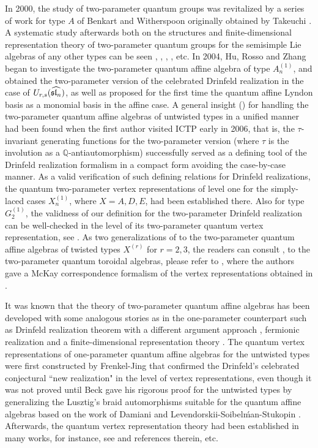 \documentclass{amsproc}
\theoremstyle{remark}
\numberwithin{equation}{section}
\begin{document}
In 2000, the study of two-parameter quantum groups was revitalized by a series of work for type $A$ of Benkart and Witherspoon \cite{BW1, BW2, BW3} originally
obtained by Takeuchi \cite{T}. A systematic study afterwards both on the structures and finite-dimensional representation theory of two-parameter quantum groups for the semisimple Lie algebras of  any other types can be seen \cite{BGH1, BGH2}, \cite{BH}, \cite{HP1, HP2}, \cite{HS, HS1, HW1, HW2}, etc.
In 2004, Hu, Rosso and Zhang \cite{HRZ} began to investigate the two-parameter
quantum affine algebra of type $A_n^{(1)}$, and obtained
the two-parameter version of the celebrated Drinfeld realization in the case of $U_{r,s}(\widehat{\frak{sl}_n})$, as well as proposed for the first time the quantum affine
Lyndon basis as a monomial basis in the affine case. A general insight (\cite{HZ}) for handling the two-parameter quantum affine algebras of untwisted types in a unified manner had been found
when the first author visited ICTP early in 2006, that is, the $\tau$-invariant generating functions for the two-parameter version (where $\tau$ is the involution as a $\mathbb Q$-antiautomorphism) successfully served as a defining tool of the Drinfeld realization formalism in a compact form avoiding the case-by-case manner. As a valid verification of such defining relations for
Drinfeld realizations, the quantum two-parameter vertex representations of level one for the simply-laced cases $X^{(1)}_n$, where $X=A, D, E$, had been established there.
Also for type $G_2^{(1)}$, the validness of our definition for the two-parameter Drinfeld realization can be well-checked in the level of its two-parameter quantum vertex representation,
see \cite{GHZ}. As two generalizations of \cite{HZ} to the two-parameter quantum affine algebras of twisted types $X^{(r)}$ for $r=2,3$, the readers can consult \cite{JZ1},
to the two-parameter quantum toroidal algebras, please refer to \cite{JZ2}, where the authors gave a McKay correspondence formalism of the vertex representations obtained in \cite{HZ}.

It was known that the theory of two-parameter quantum affine algebras has been developed with some analogous stories as in the
one-parameter counterpart such as Drinfeld realization theorem with a different argument approach \cite{HRZ, HZ, JZ1}, fermionic realization \cite{JZ3} and a finite-dimensional representation theory \cite{JZ4}.
The quantum vertex representations of one-parameter quantum affine algebras for the untwisted types were
first constructed by Frenkel-Jing \cite{FJ} that confirmed the Drinfeld's celebrated conjectural ``new realization" \cite{Dr2} in the level of vertex representations, even though
it was not proved until Beck gave his rigorous proof for the untwisted types by generalizing the Lusztig's braid automorphisms suitable for the quantum affine algebras based on the work of Damiani \cite{D} and Levendorskii-Soibel\'man-Stukopin \cite{LSS}.  Afterwards, the quantum vertex representation theory had been established in many works, for instance, see
\cite{Be, J1, JM, J2, JKM1, JKM2} and references therein, etc.
\end{document}
